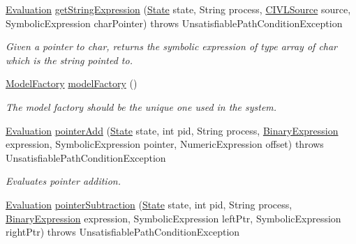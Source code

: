 \begin{DoxyCompactItemize}
\hyperlink{classedu_1_1udel_1_1cis_1_1vsl_1_1civl_1_1semantics_1_1IF_1_1Evaluation}{Evaluation} \hyperlink{interfaceedu_1_1udel_1_1cis_1_1vsl_1_1civl_1_1semantics_1_1IF_1_1Evaluator_a86629e51ec364d6e9996b116dd6fba47}{get\+String\+Expression} (\hyperlink{interfaceedu_1_1udel_1_1cis_1_1vsl_1_1civl_1_1state_1_1IF_1_1State}{State} state, String process, \hyperlink{interfaceedu_1_1udel_1_1cis_1_1vsl_1_1civl_1_1model_1_1IF_1_1CIVLSource}{C\+I\+V\+L\+Source} source, Symbolic\+Expression char\+Pointer)  throws Unsatisfiable\+Path\+Condition\+Exception
\begin{DoxyCompactList}\small\item\em Given a pointer to char, returns the symbolic expression of type array of char which is the string pointed to. \end{DoxyCompactList}\item 
\hyperlink{interfaceedu_1_1udel_1_1cis_1_1vsl_1_1civl_1_1model_1_1IF_1_1ModelFactory}{Model\+Factory} \hyperlink{interfaceedu_1_1udel_1_1cis_1_1vsl_1_1civl_1_1semantics_1_1IF_1_1Evaluator_aa0450cda9d9457f31fbd68076a564bc4}{model\+Factory} ()
\begin{DoxyCompactList}\small\item\em The model factory should be the unique one used in the system. \end{DoxyCompactList}\item 
\hyperlink{classedu_1_1udel_1_1cis_1_1vsl_1_1civl_1_1semantics_1_1IF_1_1Evaluation}{Evaluation} \hyperlink{interfaceedu_1_1udel_1_1cis_1_1vsl_1_1civl_1_1semantics_1_1IF_1_1Evaluator_ab051cc7155755a0c75b56f1cffd87cc0}{pointer\+Add} (\hyperlink{interfaceedu_1_1udel_1_1cis_1_1vsl_1_1civl_1_1state_1_1IF_1_1State}{State} state, int pid, String process, \hyperlink{interfaceedu_1_1udel_1_1cis_1_1vsl_1_1civl_1_1model_1_1IF_1_1expression_1_1BinaryExpression}{Binary\+Expression} expression, Symbolic\+Expression pointer, Numeric\+Expression offset)  throws Unsatisfiable\+Path\+Condition\+Exception
\begin{DoxyCompactList}\small\item\em Evaluates pointer addition. \end{DoxyCompactList}\item 
\hyperlink{classedu_1_1udel_1_1cis_1_1vsl_1_1civl_1_1semantics_1_1IF_1_1Evaluation}{Evaluation} \hyperlink{interfaceedu_1_1udel_1_1cis_1_1vsl_1_1civl_1_1semantics_1_1IF_1_1Evaluator_addbd6a2316ecd2e89bd29c3f1d878b1a}{pointer\+Subtraction} (\hyperlink{interfaceedu_1_1udel_1_1cis_1_1vsl_1_1civl_1_1state_1_1IF_1_1State}{State} state, int pid, String process, \hyperlink{interfaceedu_1_1udel_1_1cis_1_1vsl_1_1civl_1_1model_1_1IF_1_1expression_1_1BinaryExpression}{Binary\+Expression} expression, Symbolic\+Expression left\+Ptr, Symbolic\+Expression right\+Ptr)  throws Unsatisfiable\+Path\+Condition\+Exception

\end{DoxyCompactItemize}
